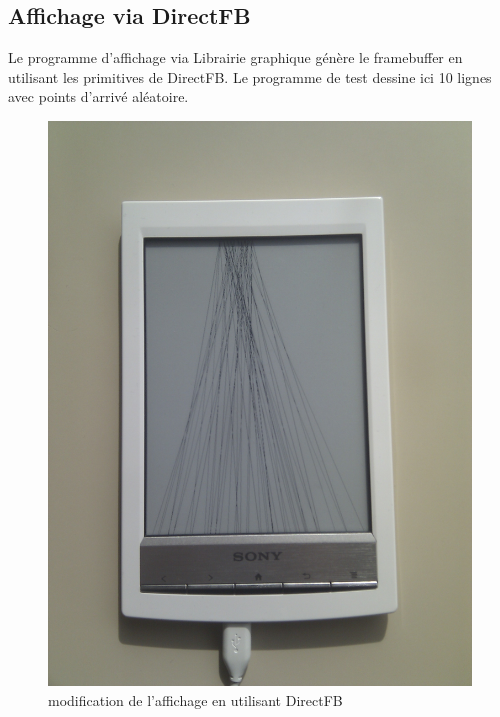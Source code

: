 \subsection{Affichage via DirectFB}

Le programme d'affichage via Librairie graphique génère le framebuffer en utilisant les primitives de DirectFB.
Le programme de test dessine ici 10 lignes avec points d'arrivé aléatoire.

	\begin{figure}[h!]
		\begin{center}
			\includegraphics[scale=0.15]{screen_direct.jpg}
			\caption{modification de l'affichage en utilisant DirectFB}
		\end{center}
	\end{figure}

